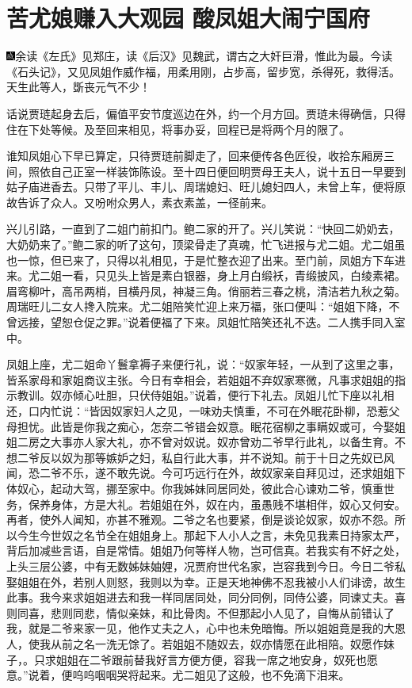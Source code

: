 
\chapter{苦尤娘赚入大观园 酸凤姐大闹宁国府}

{\includegraphics[width=3mm]{../Images/00005}\kaishu 余读《左氏》见郑庄，读《后汉》见魏武，谓古之大奸巨滑，惟此为最。今读《石头记》，又见凤姐作威作福，用柔用刚，占步高，留步宽，杀得死，救得活。天生此等人，斲丧元气不少！}

话说贾琏起身去后，偏值平安节度巡边在外，约一个月方回。贾琏未得确信，只得住在下处等候。及至回来相见，将事办妥，回程已是将两个月的限了。

谁知凤姐心下早已算定，只待贾琏前脚走了，回来便传各色匠役，收拾东厢房三间，照依自己正室一样装饰陈设。至十四日便回明贾母王夫人，说十五日一早要到姑子庙进香去。只带了平儿、丰儿、周瑞媳妇、旺儿媳妇四人，未曾上车，便将原故告诉了众人。又吩咐众男人，素衣素盖，一径前来。

兴儿引路，一直到了二姐门前扣门。鲍二家的开了。兴儿笑说：``快回二奶奶去，大奶奶来了。''鲍二家的听了这句，顶梁骨走了真魂，忙飞进报与尤二姐。尤二姐虽也一惊，但已来了，只得以礼相见，于是忙整衣迎了出来。至门前，凤姐方下车进来。尤二姐一看，只见头上皆是素白银器，身上月白缎袄，青缎披风，白绫素裙。眉弯柳叶，高吊两梢，目横丹凤，神凝三角。俏丽若三春之桃，清洁若九秋之菊。周瑞旺儿二女人搀入院来。尤二姐陪笑忙迎上来万福，张口便叫：``姐姐下降，不曾远接，望恕仓促之罪。''说着便福了下来。凤姐忙陪笑还礼不迭。二人携手同入室中。

凤姐上座，尤二姐命丫鬟拿褥子来便行礼，说：``奴家年轻，一从到了这里之事，皆系家母和家姐商议主张。今日有幸相会，若姐姐不弃奴家寒微，凡事求姐姐的指示教训。奴亦倾心吐胆，只伏侍姐姐。''说着，便行下礼去。凤姐儿忙下座以礼相还，口内忙说：``皆因奴家妇人之见，一味劝夫慎重，不可在外眠花卧柳，恐惹父母担忧。此皆是你我之痴心，怎奈二爷错会奴意。眠花宿柳之事瞒奴或可，今娶姐姐二房之大事亦人家大礼，亦不曾对奴说。奴亦曾劝二爷早行此礼，以备生育。不想二爷反以奴为那等嫉妒之妇，私自行此大事，并不说知。前于十日之先奴已风闻，恐二爷不乐，遂不敢先说。今可巧远行在外，故奴家亲自拜见过，还求姐姐下体奴心，起动大驾，挪至家中。你我姊妹同居同处，彼此合心谏劝二爷，慎重世务，保养身体，方是大礼。若姐姐在外，奴在内，虽愚贱不堪相伴，奴心又何安。再者，使外人闻知，亦甚不雅观。二爷之名也要紧，倒是谈论奴家，奴亦不怨。所以今生今世奴之名节全在姐姐身上。那起下人小人之言，未免见我素日持家太严，背后加减些言语，自是常情。姐姐乃何等样人物，岂可信真。若我实有不好之处，上头三层公婆，中有无数姊妹妯娌，况贾府世代名家，岂容我到今日。今日二爷私娶姐姐在外，若别人则怒，我则以为幸。正是天地神佛不忍我被小人们诽谤，故生此事。我今来求姐姐进去和我一样同居同处，同分同例，同侍公婆，同谏丈夫。喜则同喜，悲则同悲，情似亲妹，和比骨肉。不但那起小人见了，自悔从前错认了我，就是二爷来家一见，他作丈夫之人，心中也未免暗悔。所以姐姐竟是我的大恩人，使我从前之名一洗无馀了。若姐姐不随奴去，奴亦情愿在此相陪。奴愿作妹子，。只求姐姐在二爷跟前替我好言方便方便，容我一席之地安身，奴死也愿意。''说着，便呜呜咽咽哭将起来。尤二姐见了这般，也不免滴下泪来。

